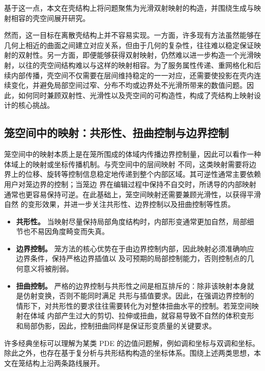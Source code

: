 基于这一点，本文在壳结构上将问题聚焦为光滑双射映射的构造，并围绕生成与映射相容的壳空间展开研究。

然而，这一目标在离散壳结构上并不容易实现。一方面，许多现有方法虽然能够在几何上相近的曲面之间建立对应关系，但由于几何的复杂性，往往难以稳定保证映射的双射性。另一方面，即便能够获得双射映射，仍然难以进一步构造一个光滑映射，以往的壳空间结构难以与这样的映射相容。为了服务属性传递、重网格化和后续内部传播，壳空间不仅需要在层间维持稳定的一一对应，还需要使投影在壳内连续变化，并避免局部空间过窄、分布不均或边界处不光滑所带来的数值问题。因此，如何同时兼顾双射性、光滑性以及壳空间的可构造性，构成了壳结构上映射设计的核心挑战。

\subsection{笼空间中的映射：共形性、扭曲控制与边界控制}

笼空间中的映射本质上是在笼所围成的体域内传播边界控制量，因此可以看作一种体域上的映射或坐标传播机制。与壳空间中的层间映射
不同，这类映射需要将边界上的位移、旋转等控制信息稳定地传递到整个内部区域。其可逆性通常主要依赖用户对笼边界的控制；当笼边
界在编辑过程中保持不自交时，所诱导的内部映射通常也更容易保持可逆。在此基础上，笼空间映射还需要兼顾光滑性，以获得平滑自然
的变形效果，并进一步关注共形性、边界控制以及扭曲控制等性质。

\begin{itemize}
	\item \textbf{共形性。} 当映射尽量保持局部角度结构时，内部形变通常更加自然，局部细节也不易因角度畸变而失真。
	\item \textbf{边界控制。} 笼方法的核心优势在于由边界控制内部，因此映射必须准确响应边界条件，保持严格边界插值以
	及可预期的局部控制能力，否则控制点的几何意义将被削弱。
	\item \textbf{扭曲控制。} 严格的边界控制与共形性之间是相互排斥的：除非该映射本身就是仿射变换，否则不能同时满足
	共形与插值要求。因此，在强调边界控制的情形下，对共形性的要求往往需要转化为对整体扭曲水平的控制。若笼空间映射在体域
	内部产生过大的剪切、拉伸或扭曲，就容易导致不自然的体积变形和局部伪影，因此，控制扭曲同样是保证形变质量的关键要求。
\end{itemize}

许多经典坐标可以理解为某类 PDE 的边值问题解，例如调和坐标与双调和坐标。除此之外，也存在基于复分析与共形结构构造的坐标体系。围绕上述两类思想，本文在笼结构上沿两条路线展开。

